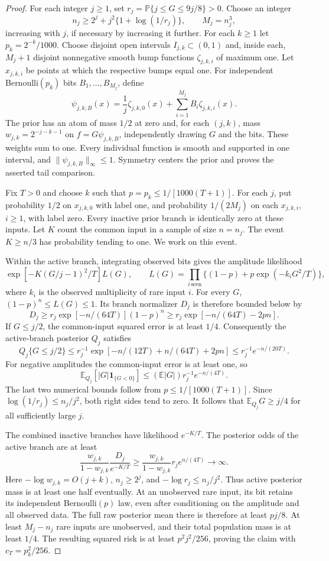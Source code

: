 \begin{proof}
For each integer $j\ge1$, set
$r_j=\mathbb P\{j\le G\le9j/8\}>0$.
Choose an integer
\[
 n_j\ge2^j+j^2\{1+\log(1/r_j)\},\qquad M_j=n_j^3,
\]
increasing with $j$, if necessary by increasing it further.
For each $k\ge1$ let $p_k=2^{-k}/1000$.
Choose disjoint open intervals $I_{j,k}\subset(0,1)$ and, inside
each, $M_j+1$ disjoint nonnegative smooth bump functions
$\zeta_{j,k,i}$ of maximum one. Let $x_{j,k,i}$ be points at which
the respective bumps equal one. For independent Bernoulli$(p_k)$
bits $B_1,\ldots,B_{M_j}$, define
\[
 \psi_{j,k,B}(x)=\frac1j\zeta_{j,k,0}(x)
                         +\sum_{i=1}^{M_j}B_i\zeta_{j,k,i}(x).
\]
The prior has an atom of mass $1/2$ at zero and, for each $(j,k)$,
mass $w_{j,k}=2^{-j-k-1}$ on $f=G\psi_{j,k,B}$, independently
drawing $G$ and the bits. These weights sum to one. Every individual
function is smooth and supported in one interval, and
$\|\psi_{j,k,B}\|_\infty\le1$. Symmetry centers the prior and
proves the asserted tail comparison.

Fix $T>0$ and choose $k$ such that
$p=p_k\le1/[1000(T+1)]$. For each $j$, put probability $1/2$ on
$x_{j,k,0}$ with label one, and probability $1/(2M_j)$ on each
$x_{j,k,i}$, $i\ge1$, with label zero. Every inactive prior branch
is identically zero at these inputs. Let $K$ count the common input
in a sample of size $n=n_j$. The event $K\ge n/3$ has probability
tending to one. We work on this event.

Within the active branch, integrating observed bits gives the
amplitude likelihood
\[
 \exp[-K(G/j-1)^2/T]L(G),\qquad
 L(G)=\prod_{i\,\mathrm{seen}}
       \{(1-p)+p\exp(-k_iG^2/T)\},
\]
where $k_i$ is the observed multiplicity of rare input $i$.
For every $G$, $(1-p)^n\le L(G)\le1$.
Its branch normalizer $D_j$ is therefore bounded below by
\[
 D_j\ge r_j\exp[-n/(64T)](1-p)^n
       \ge r_j\exp[-n/(64T)-2pn].
\]
If $G\le j/2$, the common-input squared error is at least $1/4$.
Consequently the active-branch posterior $Q_j$ satisfies
\[
 Q_j\{G\le j/2\}
 \le r_j^{-1}\exp[-n/(12T)+n/(64T)+2pn]
 \le r_j^{-1}e^{-n/(20T)}.
\]
For negative amplitudes the common-input error is at least one, so
\[
 \mathbb E_{Q_j}[|G|\mathbf1_{\{G<0\}}]
       \le(\mathbb E|G|)r_j^{-1}e^{-n/(4T)}.
\]
The last two numerical bounds follow from
$p\le1/[1000(T+1)]$. Since
$\log(1/r_j)\le n_j/j^2$, both right sides tend to zero.
It follows that $\mathbb E_{Q_j}G\ge j/4$ for all sufficiently
large $j$.

The combined inactive branches have likelihood $e^{-K/T}$.
The posterior odds of the active branch are at least
\[
 \frac{w_{j,k}}{1-w_{j,k}}\frac{D_j}{e^{-K/T}}
       \ge\frac{w_{j,k}}{1-w_{j,k}}r_j e^{n/(4T)}
       \longrightarrow\infty.
\]
Here $-\log w_{j,k}=O(j+k)$, $n_j\ge2^j$, and
$-\log r_j\le n_j/j^2$. Thus active posterior mass is at least
one half eventually. At an unobserved rare input, its bit retains
its independent Bernoulli$(p)$ law, even after conditioning on the
amplitude and all observed data. The full raw posterior mean there is
therefore at least $p j/8$. At least $M_j-n_j$ rare inputs are
unobserved, and their total population mass is at least $1/4$.
The resulting squared risk is at least $p^2j^2/256$, proving the
claim with $c_T=p_k^2/256$.


\end{proof}
